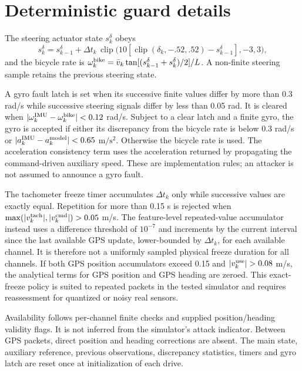﻿\documentclass[10pt,a4paper]{article}
\newcommand{\clip}{\operatorname{clip}}
\begin{document}
\section{Deterministic guard details}\label{app:guards}
The steering actuator state $s^\delta_k$ obeys
\begin{equation}
 s^\delta_k=s^\delta_{k-1}+
 \Delta t_k\,\clip\big(10[\clip(\delta_k,-.52,.52)-s^\delta_{k-1}],-3,3\big),
\end{equation}
and the bicycle rate is
$\omega_k^{\rm bike}=\bar v_k\tan[(s^\delta_{k-1}+s^\delta_k)/2]/L$.
A non-finite steering sample retains the previous steering state.

A gyro fault latch is set when its successive finite values differ by more than
0.3 rad/s while successive steering signals differ by less than 0.05 rad.
It is cleared when $|\omega_k^{\rm IMU}-\omega_k^{\rm bike}|<0.12$ rad/s.
Subject to a clear latch and a finite gyro, the gyro is accepted if either its
discrepancy from the bicycle rate is below 0.3 rad/s or
$|a_k^{\rm IMU}-a_k^{\rm model}|<0.65$ $\mathrm{m/s^2}$.
Otherwise the bicycle rate is used.
The acceleration consistency term uses the acceleration returned by propagating the
command-driven auxiliary speed. These are implementation rules; an attacker is not
assumed to announce a gyro fault.

The tachometer freeze timer accumulates $\Delta t_k$ only while successive values
are exactly equal. Repetition for more than 0.15 s is rejected when
$\max(|v_k^{\rm tach}|,|v_k^{\rm cmd}|)>0.05$ m/s.
The feature-level repeated-value accumulator instead uses a difference threshold of
$10^{-7}$ and increments by the current interval since the last available GPS update,
lower-bounded by $\Delta t_k$, for each available channel.
It is therefore not a uniformly sampled physical freeze duration for all channels.
If both GPS position accumulators exceed 0.15 and $|v_k^{\rm use}|>0.08$ m/s,
the analytical terms for GPS position and GPS heading are zeroed.
This exact-freeze policy is suited to repeated packets in the tested simulator and
requires reassessment for quantized or noisy real sensors.

Availability follows per-channel finite checks and supplied position/heading
validity flags. It is not inferred from the simulator's attack indicator.
Between GPS packets, direct position and heading corrections are absent.
The main state, auxiliary reference, previous observations, discrepancy statistics,
timers and gyro latch are reset once at initialization of each drive.
\end{document}
